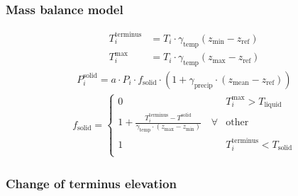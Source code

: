 \documentclass[12pt, aspectratio=169, abstract=off, oneside]{beamer}
\begin{document}
    \begin{frame}[t]\frametitle{Mass balance model}
        
        \centering
        \begin{align*}
            T_i^\text{terminus} &= T_i \cdot \gamma_\text{temp} (z_\text{min} - z_\text{ref})\\
            T_{i}^\text{max} &= T_i \cdot \gamma_\text{temp} (z_\text{max} - z_\text{ref})
        \end{align*}
        \begin{align*}
            P_i^\text{solid} = a \cdot P_i \cdot f_\text{solid} \cdot (1 + \gamma_\text{precip} \cdot (z_\text{mean} - z_\text{ref}))
        \end{align*}
        \begin{align*}
            f_\text{solid} = 
                \begin{cases}
                    0   \quad & T_{i}^\text{max} > T_\text{liquid}\\
                    1 + \frac{T_{i}^\text{terminus} - T^\text{solid}}{\gamma_\text{temp}\cdot(z_\text{max} - z_\text{min})} \quad \forall & \text{other}\\
                    1   \quad & T_{i}^\text{terminus} < T_\text{solid} \\
                \end{cases}
        \end{align*}
        
    \end{frame}



    \begin{frame}[t]\frametitle{Change of terminus elevation}
        
        \centering
    
    \end{frame}
\end{document}
